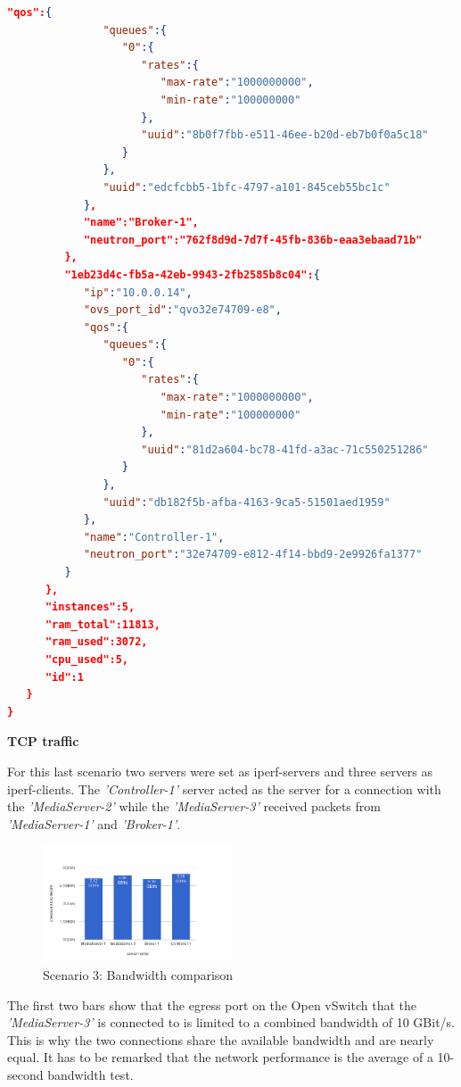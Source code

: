 \begin{lstlisting}[language=json,firstnumber=1]
            "qos":{  
               "queues":{  
                  "0":{  
                     "rates":{  
                        "max-rate":"1000000000",
                        "min-rate":"100000000"
                     },
                     "uuid":"8b0f7fbb-e511-46ee-b20d-eb7b0f0a5c18"
                  }
               },
               "uuid":"edcfcbb5-1bfc-4797-a101-845ceb55bc1c"
            },
            "name":"Broker-1",
            "neutron_port":"762f8d9d-7d7f-45fb-836b-eaa3ebaad71b"
         },
         "1eb23d4c-fb5a-42eb-9943-2fb2585b8c04":{  
            "ip":"10.0.0.14",
            "ovs_port_id":"qvo32e74709-e8",
            "qos":{  
               "queues":{  
                  "0":{  
                     "rates":{  
                        "max-rate":"1000000000",
                        "min-rate":"100000000"
                     },
                     "uuid":"81d2a604-bc78-41fd-a3ac-71c550251286"
                  }
               },
               "uuid":"db182f5b-afba-4163-9ca5-51501aed1959"
            },
            "name":"Controller-1",
            "neutron_port":"32e74709-e812-4f14-bbd9-2e9926fa1377"
         }
      },
      "instances":5,
      "ram_total":11813,
      "ram_used":3072,
      "cpu_used":5,
      "id":1
   }
}
\end{lstlisting}

\textbf{TCP traffic}

For this last scenario two servers were set as iperf-servers and three servers as iperf-clients. The \textit{'Controller-1'} server acted as the server for a connection with the \textit{'MediaServer-2'} while the \textit{'MediaServer-3'} received packets from \textit{'MediaServer-1'} and \textit{'Broker-1'}.

\begin{figure}[H]
\centering

\includegraphics[width=0.5\textwidth]{images/evaluation/testbed_scenario2_bw}

\caption{Scenario 3: Bandwidth comparison}
\end{figure}

The first two bars show that the egress port on the Open vSwitch that the \textit{'MediaServer-3'} is connected to is limited to a combined bandwidth of 10 GBit/s. This is why the two connections share the available bandwidth and are nearly equal. It has to be remarked that the network performance is the average of a 10-second bandwidth test.

